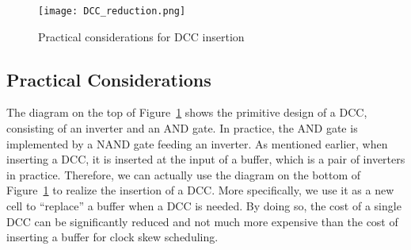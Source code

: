 \begin{figure}
    \centering
    \texttt{[image: DCC\_reduction.png]}
    \caption{Practical considerations for DCC insertion}
    \label{fig:dccreduc}
\end{figure}

\subsection{Practical Considerations}
\label{subsec:tpc}
The diagram on the top of Figure~\ref{fig:dccreduc} shows the primitive design of a DCC, consisting of an inverter and an AND gate. In practice, the AND gate is implemented by a NAND gate feeding an inverter. As mentioned earlier, when inserting a DCC, it is inserted at the input of a buffer, which is a pair of inverters in practice. Therefore, we can actually use the diagram on the bottom of Figure~\ref{fig:dccreduc} to realize the insertion of a DCC. More specifically, we use it as a new cell to \enquote{replace} a buffer when a DCC is needed. By doing so, the cost of a single DCC can be significantly reduced and not much more expensive than the cost of inserting a buffer for clock skew scheduling. 
